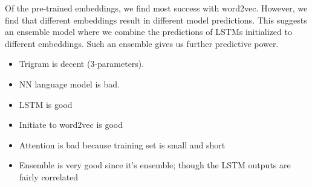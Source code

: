 \documentclass[12pt]{article}
\begin{document}
Of the pre-trained embeddings, we find most success with word2vec. However, we
find that different embeddings result in different model predictions. This
suggests an ensemble model where we combine the predictions of LSTMs initialized
to different embeddings. Such an ensemble gives us further predictive power.


\begin{itemize}
     \item Trigram is decent (3-parameters). 
     \item NN language model is bad. 
     \item LSTM is good
     \item Initiate to word2vec is good
     \item Attention is bad because training set is small and short
     \item Ensemble is very good since it's ensemble; though the LSTM outputs are fairly correlated
 \end{itemize} 
\end{document}
